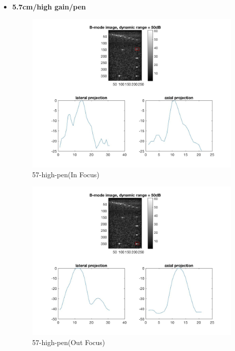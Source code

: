 \documentclass[12pts,a4paper]{article}
\begin{document}
\pagebreak
\begin{itemize}
\item{\textbf{5.7cm/high gain/pen}}
\begin{center}
\end{center}
\begin{figure}[h]
    \centering
    \includegraphics[width=1.0\textwidth]{img_hw1/57-high-pen1.jpg}
    \caption{57-high-pen(In Focus)}
    \label{fig:mesh1}
\end{figure}
\pagebreak
\begin{figure}[h]
    \centering
    \includegraphics[width=1.0\textwidth]{img_hw1/57-high-pen2.jpg}
    \caption{57-high-pen(Out Focus)}
    \label{fig:mesh1}
\end{figure}
\pagebreak


\end{itemize}
\end{document}
